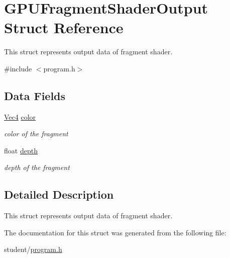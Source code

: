 \hypertarget{structGPUFragmentShaderOutput}{}\section{G\+P\+U\+Fragment\+Shader\+Output Struct Reference}
\label{structGPUFragmentShaderOutput}


This struct represents output data of fragment shader.  




{\ttfamily \#include $<$program.\+h$>$}

\subsection*{Data Fields}
\begin{DoxyCompactItemize}
\item 
\hyperlink{structVec4}{Vec4} \hyperlink{structGPUFragmentShaderOutput_a209315abb3483aac58aad3954e8ecad1}{color}\hypertarget{structGPUFragmentShaderOutput_a209315abb3483aac58aad3954e8ecad1}{}\label{structGPUFragmentShaderOutput_a209315abb3483aac58aad3954e8ecad1}

\begin{DoxyCompactList}\small\item\em color of the fragment \end{DoxyCompactList}\item 
float \hyperlink{structGPUFragmentShaderOutput_aa46a61b8c73bc9766ae2b556bcce62a3}{depth}\hypertarget{structGPUFragmentShaderOutput_aa46a61b8c73bc9766ae2b556bcce62a3}{}\label{structGPUFragmentShaderOutput_aa46a61b8c73bc9766ae2b556bcce62a3}

\begin{DoxyCompactList}\small\item\em depth of the fragment \end{DoxyCompactList}\end{DoxyCompactItemize}


\subsection{Detailed Description}
This struct represents output data of fragment shader. 

The documentation for this struct was generated from the following file\+:\begin{DoxyCompactItemize}
\item 
student/\hyperlink{program_8h}{program.\+h}\end{DoxyCompactItemize}
